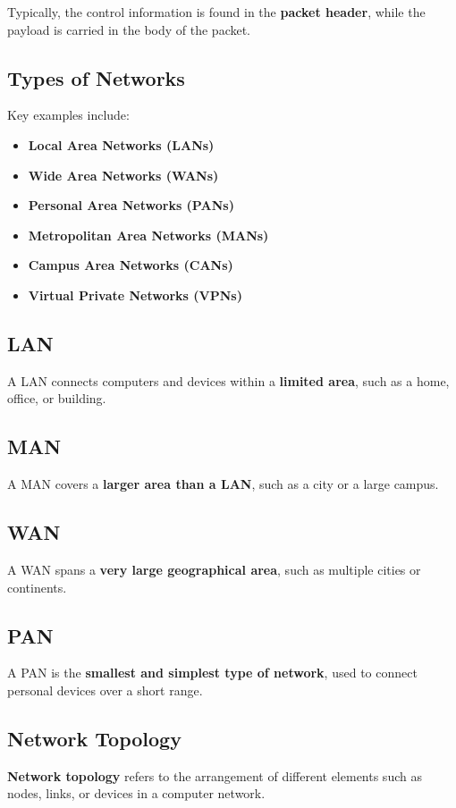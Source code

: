 \documentclass[11pt]{article}
\begin{document}
Typically, the control information is found in the \textbf{packet header}, while the payload is carried in the body of the packet.

\subsection*{Types of Networks}
Key examples include:
\begin{itemize}
    \item \textbf{Local Area Networks (LANs)}
    \item \textbf{Wide Area Networks (WANs)}
    \item \textbf{Personal Area Networks (PANs)}
    \item \textbf{Metropolitan Area Networks (MANs)}
    \item \textbf{Campus Area Networks (CANs)}
    \item \textbf{Virtual Private Networks (VPNs)}
\end{itemize}

\subsection*{LAN}
A LAN connects computers and devices within a \textbf{limited area}, such as a home, office, or building.

\subsection*{MAN}
A MAN covers a \textbf{larger area than a LAN}, such as a city or a large campus.

\subsection*{WAN}
A WAN spans a \textbf{very large geographical area}, such as multiple cities or continents.

\subsection*{PAN}
A PAN is the \textbf{smallest and simplest type of network}, used to connect personal devices over a short range.

\subsection*{Network Topology}
\textbf{Network topology} refers to the arrangement of different elements such as nodes, links, or devices in a computer network.
\end{document}
